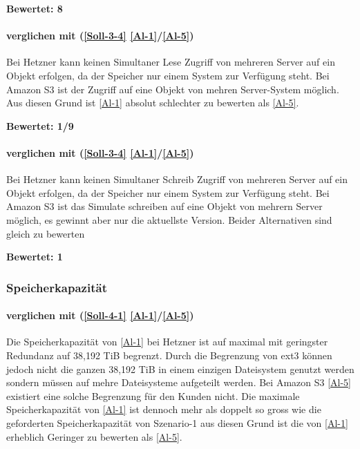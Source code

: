 \textbf{Bewertet: 8} 


\paragraph*{  verglichen mit  (\ref{Soll-3-4} \ref{Al-1}/\ref{Al-5})}
Bei Hetzner kann keinen Simultaner Lese Zugriff von mehreren Server auf ein Objekt erfolgen, da der Speicher nur einem System zur Verfügung steht. Bei Amazon S3 ist der Zugriff auf eine Objekt von mehren Server-System möglich. Aus diesen Grund ist  \ref{Al-1} absolut schlechter zu bewerten als  \ref{Al-5}.

\textbf{Bewertet: 1/9} 

\paragraph*{  verglichen mit  (\ref{Soll-3-4} \ref{Al-1}/\ref{Al-5})}
Bei Hetzner kann keinen Simultaner Schreib Zugriff von mehreren Server auf ein Objekt erfolgen, da der Speicher nur einem System zur Verfügung steht. Bei Amazon S3 ist das Simulate schreiben auf eine Objekt von mehrern Server möglich, es gewinnt aber nur die aktuellste Version.
Beider Alternativen sind gleich zu bewerten

\textbf{Bewertet: 1}

\subsubsection{Speicherkapazität}

\paragraph*{  verglichen mit  (\ref{Soll-4-1} \ref{Al-1}/\ref{Al-5})} 
Die Speicherkapazität von \ref{Al-1} bei Hetzner ist auf maximal mit geringster Redundanz auf 38,192 TiB begrenzt. Durch die Begrenzung von ext3 können jedoch nicht die ganzen 38,192 TiB in einem einzigen Dateisystem genutzt werden sondern müssen auf mehre Dateisysteme aufgeteilt werden. Bei Amazon S3 \ref{Al-5} existiert eine solche Begrenzung für den Kunden nicht. Die maximale Speicherkapazität von \ref{Al-1} ist dennoch mehr als doppelt so gross wie die geforderten Speicherkapazität von Szenario-1 aus diesen Grund ist die  von \ref{Al-1} erheblich Geringer zu bewerten als \ref{Al-5}.

